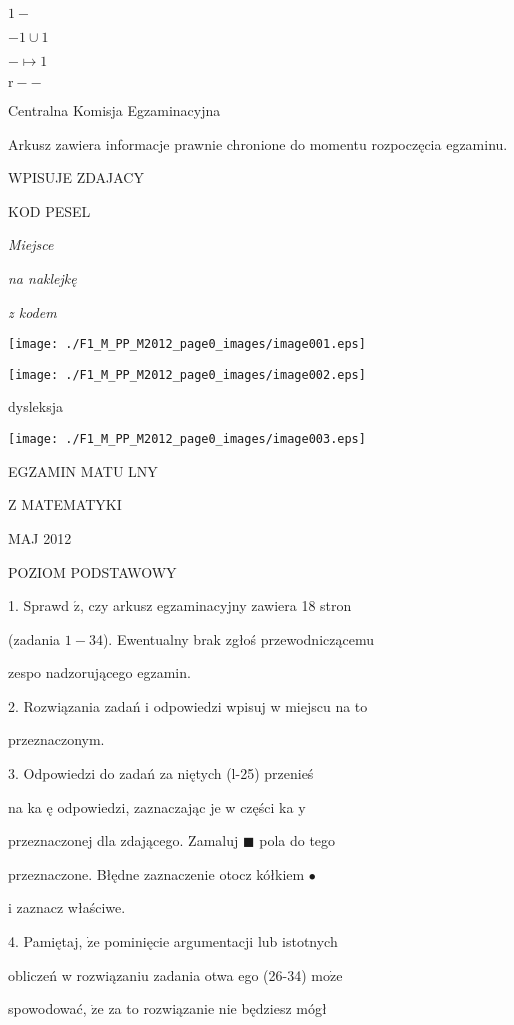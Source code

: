 \documentclass[a4paper,12pt]{article}
\begin{document}
$1-$

$-1\cup 1$

$-\mapsto 1$

$\mathrm{r}--$

Centralna Komisja Egzaminacyjna

Arkusz zawiera informacje prawnie chronione do momentu rozpoczęcia egzaminu.

WPISUJE ZDAJACY

KOD PESEL

{\it Miejsce}

{\it na naklejkę}

{\it z kodem}
\begin{center}
\texttt{[image: ./F1\_M\_PP\_M2012\_page0\_images/image001.eps]}

\texttt{[image: ./F1\_M\_PP\_M2012\_page0\_images/image002.eps]}
\end{center}
\fbox{} dysleksja
\begin{center}
\texttt{[image: ./F1\_M\_PP\_M2012\_page0\_images/image003.eps]}
\end{center}
EGZAMIN MATU LNY

Z MATEMATYKI

MAJ 2012

POZIOM PODSTAWOWY

1. Sprawd $\acute{\mathrm{z}}$, czy arkusz egzaminacyjny zawiera 18 stron

(zadania $1-34$). Ewentualny brak zgłoś przewodniczącemu

zespo nadzorującego egzamin.

2. Rozwiązania zadań i odpowiedzi wpisuj w miejscu na to

przeznaczonym.

3. Odpowiedzi do zadań za niętych (l-25) przenieś

na ka ę odpowiedzi, zaznaczając je w części ka $\mathrm{y}$

przeznaczonej dla zdającego. Zamaluj $\blacksquare$ pola do tego

przeznaczone. Błędne zaznaczenie otocz kółkiem \fcircle$\bullet$

i zaznacz właściwe.

4. Pamiętaj, $\dot{\mathrm{z}}\mathrm{e}$ pominięcie argumentacji lub istotnych

obliczeń w rozwiązaniu zadania otwa ego (26-34) $\mathrm{m}\mathrm{o}\dot{\mathrm{z}}\mathrm{e}$

spowodować, $\dot{\mathrm{z}}\mathrm{e}$ za to rozwiązanie nie będziesz mógł
\end{document}

